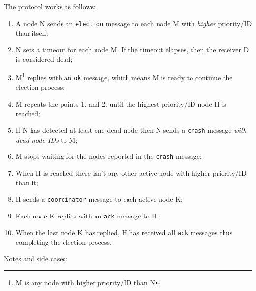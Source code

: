 The protocol works as follows:

\begin{enumerate}
\item A node N sends an \texttt{election} message to each node M with
  \textit{higher} priority/ID than itself;
\item N sets a timeout for each node M. If the timeout elapses, then the
  receiver D is considered dead; %
\item M\footnote{M is any node with higher priority/ID than N} replies with an
  \texttt{ok} message, which means M is ready to continue the election process;
\item M repeats the points 1. and 2. until the highest priority/ID node H is
  reached;
\item If N has detected at least one dead node then N sends a \texttt{crash}
  message \textit{with dead node IDs} to M;
\item M stops waiting for the nodes reported in the \texttt{crash} message;
\item When H is reached there isn't any other active node with higher
  priority/ID than it;
\item H sends a \texttt{coordinator} message to each active node K;
\item Each node K replies with an \texttt{ack} message to H;
\item When the last node K has replied, H has received all \texttt{ack}
  messages thus completing the election process.
\end{enumerate}

Notes and side cases:

